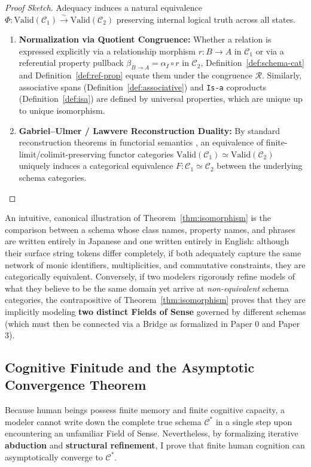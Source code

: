 \documentclass[11pt,a4paper]{article}
\theoremstyle{definition}
\theoremstyle{plain}
\theoremstyle{remark}
\newcommand{\Valid}{\mathrm{Valid}}
\begin{document}
\begin{proof}[Proof Sketch]
Adequacy induces a natural equivalence $\Phi : \Valid(\mathcal{C}_1) \xrightarrow{\sim} \Valid(\mathcal{C}_2)$ preserving internal logical truth across all states.
\begin{enumerate}
    \item \textbf{Normalization via Quotient Congruence:} Whether a relation is expressed explicitly via a relationship morphism $r : B \to A$ in $\mathcal{C}_1$ or via a referential property pullback $\beta_{B \to A} = \alpha_I \circ r$ in $\mathcal{C}_2$, Definition~\ref{def:schema-cat} and Definition~\ref{def:ref-prop} equate them under the congruence $\mathcal{R}$. Similarly, associative spans (Definition~\ref{def:associative}) and \texttt{Is-a} coproducts (Definition~\ref{def:isa}) are defined by universal properties, which are unique up to unique isomorphism.
    \item \textbf{Gabriel--Ulmer / Lawvere Reconstruction Duality:} By standard reconstruction theorems in functorial semantics \cite{lawvere1963,gabriel1971}, an equivalence of finite-limit/colimit-preserving functor categories $\Valid(\mathcal{C}_1) \simeq \Valid(\mathcal{C}_2)$ uniquely induces a categorical equivalence $F : \mathcal{C}_1 \simeq \mathcal{C}_2$ between the underlying schema categories. \qedhere
\end{enumerate}
\end{proof}

An intuitive, canonical illustration of Theorem~\ref{thm:isomorphism} is the comparison between a schema whose class names, property names, and phrases are written entirely in Japanese and one written entirely in English: although their surface string tokens differ completely, if both adequately capture the same network of monic identifiers, multiplicities, and commutative constraints, they are categorically equivalent. Conversely, if two modelers rigorously refine models of what they believe to be the same domain yet arrive at \emph{non-equivalent} schema categories, the contrapositive of Theorem~\ref{thm:isomorphism} proves that they are implicitly modeling \textbf{two distinct Fields of Sense} governed by different schemas (which must then be connected via a Bridge as formalized in Paper 0 and Paper 3).

\subsection{Cognitive Finitude and the Asymptotic Convergence Theorem}
Because human beings possess finite memory and finite cognitive capacity, a modeler cannot write down the complete true schema $\mathcal{C}^*$ in a single step upon encountering an unfamiliar Field of Sense. Nevertheless, by formalizing iterative \textbf{abduction} \cite{peirce1903} and \textbf{structural refinement}, I prove that finite human cognition can asymptotically converge to $\mathcal{C}^*$.
\end{document}
